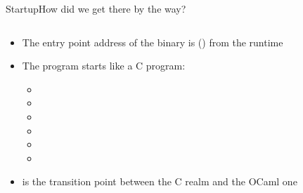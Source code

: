 \begin{frame}{Startup}{How did we get there by the way?}
\begin{columns}
\begin{column}{0.45\textwidth}
\begin{itemize}
\item The entry point address of the binary is  () from the runtime
\item The program starts like a C program:
\begin{itemize}
\item {}
\item {}
\item {}
\item {}
\item {}
\item {}
\end{itemize}
\item {} is the transition point between the C realm and the OCaml one
\end{itemize}
\bigskip
{}
\end{column}
\begin{column}{0.55\textwidth}
\end{column}
\end{columns}
\end{frame}


